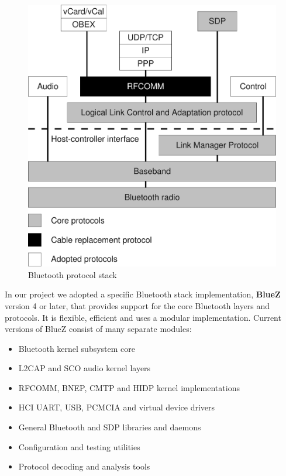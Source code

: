 \documentclass[conference]{IEEEtran}
\begin{document}
\begin{figure}[h]
\centering
\includegraphics[scale=0.4]{BTstack.pdf}
\caption{Bluetooth protocol stack}
\label{stack}
\end{figure}

In our project we adopted a specific Bluetooth stack implementation, \textbf{BlueZ} version 4 or later, that provides support for the core Bluetooth layers and protocols. It is flexible, efficient and uses a modular implementation. Current versions of BlueZ consist of many separate modules:
\begin{itemize}
\item Bluetooth kernel subsystem core
\item L2CAP and SCO audio kernel layers
\item RFCOMM, BNEP, CMTP and HIDP kernel implementations
\item HCI UART, USB, PCMCIA and virtual device drivers
\item General Bluetooth and SDP libraries and daemons
\item Configuration and testing utilities
\item Protocol decoding and analysis tools
\end{itemize}
\end{document}
